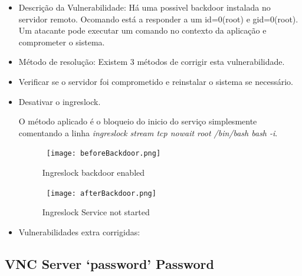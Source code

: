 \begin{itemize}
\item Descrição da Vulnerabilidade: Há uma possivel backdoor instalada no servidor remoto. Ocomando está a responder a um id=0(root) e gid=0(root). Um atacante pode executar um comando no contexto da aplicação e comprometer o sistema.

\item Método de resolução: Existem 3 métodos de corrigir esta vulnerabilidade.

\par\item Verificar se o servidor foi comprometido e reinstalar o sistema se necessário. 
\par\item Desativar o ingreslock.
\par O método aplicado é o bloqueio do inicio do serviço simplesmente comentando a linha \textit{ingreslock stream tcp nowait root /bin/bash bash -i}.
\begin{figure}[H]

  \centering

  \hbox{\hspace{-6em} \texttt{[image: beforeBackdoor.png]}}

  \caption {Ingreslock backdoor enabled}

  \label {fig3}

\end{figure}
\begin{figure}[H]

  \centering

  \hbox{\hspace{-6em} \texttt{[image: afterBackdoor.png]}}

  \caption {Ingreslock Service not started}

  \label {fig3}

\end{figure}
\item Vulnerabilidades extra corrigidas:
\end{itemize}

\subsection{VNC Server ‘password’ Password}

